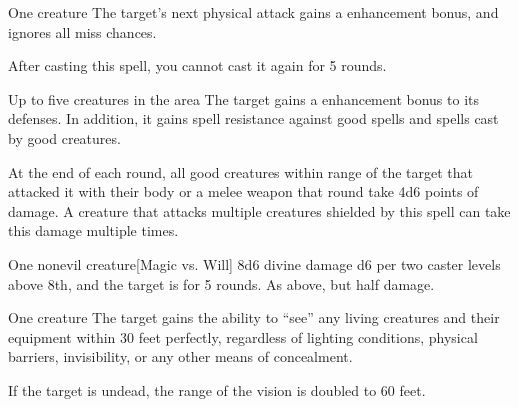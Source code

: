 \spellrng{\rngmed}
\begin{spelltarget}{One creature}
    \spelleffect The target's next physical attack gains a  enhancement bonus, and ignores all miss chances. 
\end{spelltarget}
\spellnotes After casting this spell, you cannot cast it again for 5 rounds.

\begin{comment}
\subsubsection{U-Z}
\end{comment}

\spelldur{\durshort \dismissable}
\begin{spelltargets}{Up to five creatures in the area}
    The target gains a  enhancement bonus to its defenses. In addition, it gains spell resistance against good spells and spells cast by good creatures.
    \par At the end of each round, all good creatures within \rngclose range of the target that attacked it with their body or a melee weapon that round take 4d6 points of damage. A creature that attacks multiple creatures shielded by this spell can take this damage multiple times.
\end{spelltargets}
\spellline

\spellrng{\rngmed}
\begin{spelltarget}{One nonevil creature}[Magic vs. Will]
    \spellsuccess 8d6 divine damage \add d6 per two caster levels above 8th, and the target is \sickened for 5 rounds.
    \spellfailure As above, but half damage.
\end{spelltarget}

\spelldur{\durlong \dismissable}
\begin{spelltarget}{One creature}
    \spelleffect The target gains the ability to ``see'' any living creatures and their equipment within 30 feet perfectly, regardless of lighting conditions, physical barriers, invisibility, or any other means of concealment.

    If the target is undead, the range of the vision is doubled to 60 feet.
\end{spelltarget}

